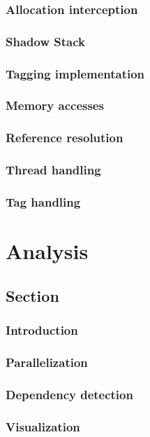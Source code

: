 \subsubsection{Allocation interception}
\subsubsection{Shadow Stack}
\subsubsection{Tagging implementation}
\subsubsection{Memory accesses}
\subsubsection{Reference resolution}
\subsubsection{Thread handling}
\subsubsection{Tag handling}

\section{Analysis}

\subsection{Section}
\subsubsection{Introduction}
\subsubsection{Parallelization}
\subsubsection{Dependency detection}
\subsubsection{Visualization}

